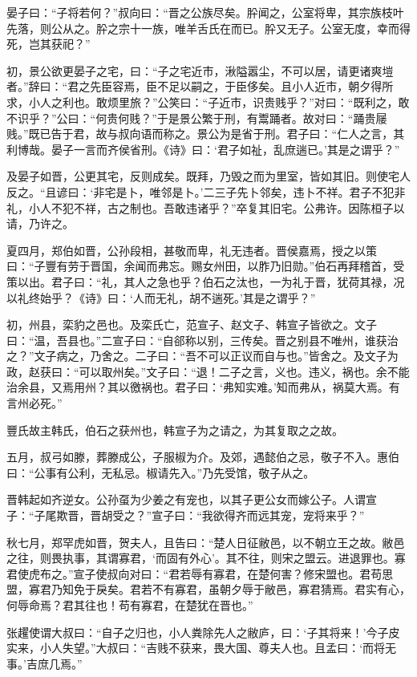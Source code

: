 \documentclass[a4paper,12pt,UTF8,twoside]{ctexbook}
\begin{document}
晏子曰：“子将若何？”叔向曰：“晋之公族尽矣。肸闻之，公室将卑，其宗族枝叶先落，则公从之。肸之宗十一族，唯羊舌氏在而已。肸又无子。公室无度，幸而得死，岂其获祀？”

初，景公欲更晏子之宅，曰：“子之宅近市，湫隘嚣尘，不可以居，请更诸爽塏者。”辞曰：“君之先臣容焉，臣不足以嗣之，于臣侈矣。且小人近市，朝夕得所求，小人之利也。敢烦里旅？”公笑曰：“子近市，识贵贱乎？”对曰：“既利之，敢不识乎？”公曰：“何贵何贱？”于是景公繁于刑，有鬻踊者。故对曰：“踊贵屦贱。”既已告于君，故与叔向语而称之。景公为是省于刑。君子曰：“仁人之言，其利博哉。晏子一言而齐侯省刑。《诗》曰：‘君子如祉，乱庶遄已。’其是之谓乎？”

及晏子如晋，公更其宅，反则成矣。既拜，乃毁之而为里室，皆如其旧。则使宅人反之。“且谚曰：‘非宅是卜，唯邻是卜。’二三子先卜邻矣，违卜不祥。君子不犯非礼，小人不犯不祥，古之制也。吾敢违诸乎？”卒复其旧宅。公弗许。因陈桓子以请，乃许之。

夏四月，郑伯如晋，公孙段相，甚敬而卑，礼无违者。晋侯嘉焉，授之以策曰：“子豐有劳于晋国，余闻而弗忘。赐女州田，以胙乃旧勋。”伯石再拜稽首，受策以出。君子曰：“礼，其人之急也乎？伯石之汰也，一为礼于晋，犹荷其禄，况以礼终始乎？《诗》曰：‘人而无礼，胡不遄死。’其是之谓乎？”

初，州县，栾豹之邑也。及栾氏亡，范宣子、赵文子、韩宣子皆欲之。文子曰：“温，吾县也。”二宣子曰：“自郤称以别，三传矣。晋之别县不唯州，谁获治之？”文子病之，乃舍之。二子曰：“吾不可以正议而自与也。”皆舍之。及文子为政，赵获曰：“可以取州矣。”文子曰：“退！二子之言，义也。违义，祸也。余不能治余县，又焉用州？其以徼祸也。君子曰：‘弗知实难。’知而弗从，祸莫大焉。有言州必死。”

豐氏故主韩氏，伯石之获州也，韩宣子为之请之，为其复取之之故。

五月，叔弓如滕，葬滕成公，子服椒为介。及郊，遇懿伯之忌，敬子不入。惠伯曰：“公事有公利，无私忌。椒请先入。”乃先受馆，敬子从之。

晋韩起如齐逆女。公孙虿为少姜之有宠也，以其子更公女而嫁公子。人谓宣子：“子尾欺晋，晋胡受之？”宣子曰：“我欲得齐而远其宠，宠将来乎？”

秋七月，郑罕虎如晋，贺夫人，且告曰：“楚人日征敝邑，以不朝立王之故。敝邑之往，则畏执事，其谓寡君，‘而固有外心’。其不往，则宋之盟云。进退罪也。寡君使虎布之。”宣子使叔向对曰：“君若辱有寡君，在楚何害？修宋盟也。君苟思盟，寡君乃知免于戾矣。君若不有寡君，虽朝夕辱于敝邑，寡君猜焉。君实有心，何辱命焉？君其往也！苟有寡君，在楚犹在晋也。”

张趯使谓大叔曰：“自子之归也，小人粪除先人之敝庐，曰：‘子其将来！’今子皮实来，小人失望。”大叔曰：“吉贱不获来，畏大国、尊夫人也。且孟曰：‘而将无事。’吉庶几焉。”
\end{document}
